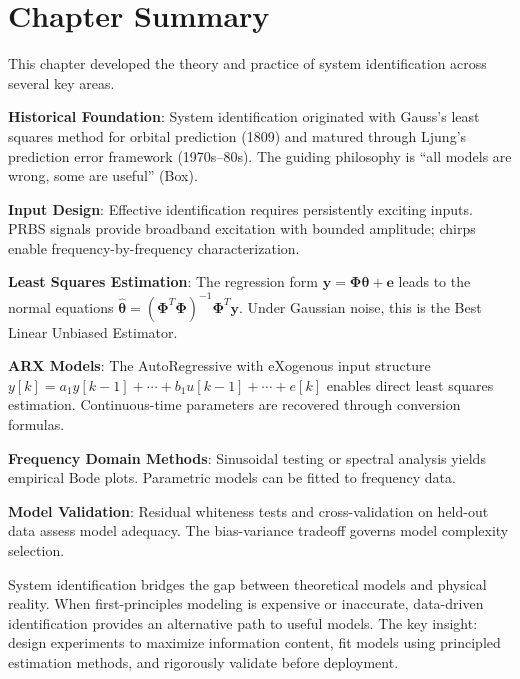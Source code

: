 \section{Chapter Summary}
\label{sec:sysid_summary}

This chapter developed the theory and practice of system identification across several key areas.

\textbf{Historical Foundation}: System identification originated with Gauss's least squares method for orbital prediction (1809) and matured through Ljung's prediction error framework (1970s--80s). The guiding philosophy is ``all models are wrong, some are useful'' (Box).

\textbf{Input Design}: Effective identification requires persistently exciting inputs. PRBS signals provide broadband excitation with bounded amplitude; chirps enable frequency-by-frequency characterization.

\textbf{Least Squares Estimation}: The regression form $\mathbf{y} = \boldsymbol{\Phi}\boldsymbol{\theta} + \mathbf{e}$ leads to the normal equations $\hat{\boldsymbol{\theta}} = (\boldsymbol{\Phi}^T\boldsymbol{\Phi})^{-1}\boldsymbol{\Phi}^T\mathbf{y}$. Under Gaussian noise, this is the Best Linear Unbiased Estimator.

\textbf{ARX Models}: The AutoRegressive with eXogenous input structure $y[k] = a_1 y[k-1] + \cdots + b_1 u[k-1] + \cdots + e[k]$ enables direct least squares estimation. Continuous-time parameters are recovered through conversion formulas.

\textbf{Frequency Domain Methods}: Sinusoidal testing or spectral analysis yields empirical Bode plots. Parametric models can be fitted to frequency data.

\textbf{Model Validation}: Residual whiteness tests and cross-validation on held-out data assess model adequacy. The bias-variance tradeoff governs model complexity selection.

\begin{tcolorbox}[colback=yellow!10!white,colframe=orange!75!black,title=Key Takeaway,sharp corners]
System identification bridges the gap between theoretical models and physical reality. When first-principles modeling is expensive or inaccurate, data-driven identification provides an alternative path to useful models. The key insight: design experiments to maximize information content, fit models using principled estimation methods, and rigorously validate before deployment.
\end{tcolorbox}

